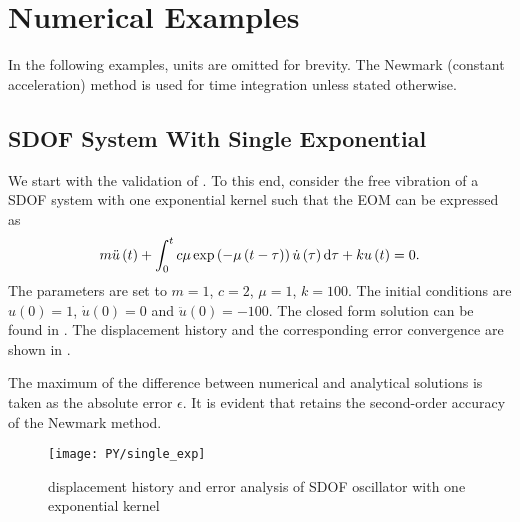 \section{Numerical Examples}
In the following examples, units are omitted for brevity.
The Newmark (constant acceleration) method is used for time integration unless stated otherwise.
\subsection{SDOF System With Single Exponential}
We start with the validation of . To this end, consider the free vibration of a SDOF system with one exponential kernel such that the EOM can be expressed as
\begin{gather}
m\ddot{u}\left(t\right)+\int_0^tc\mu\exp\left(-\mu\left(t-\tau\right)\right)\dot{u}\left(\tau\right)\mathrm{d}\tau+ku\left(t\right)=0.
\end{gather}
The parameters are set to $m=1$, $c=2$, $\mu=1$, $k=100$.
The initial conditions are $u\left(0\right)=1$, $\dot{u}\left(0\right)=0$ and $\ddot{u}\left(0\right)=-100$.
The closed form solution can be found in .
The displacement history and the corresponding error convergence are shown in .

The maximum of the difference between numerical and analytical solutions is taken as the absolute error $\epsilon$. It is evident that  retains the second-order accuracy of the Newmark method.
\begin{figure}[H]
\centering
\texttt{[image: PY/single\_exp]}
\caption{displacement history and error analysis of SDOF oscillator with one exponential kernel}\label{fig:sdof}
\end{figure}
